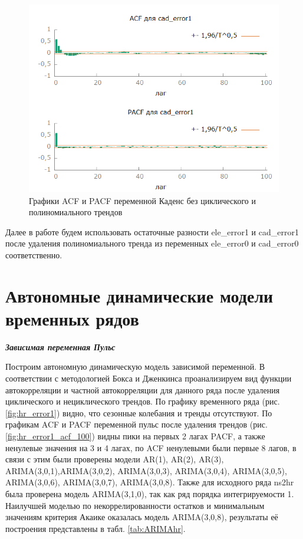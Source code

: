 \documentclass[a4paper,12pt]{article}
\begin{document}
\begin{figure}[H]
	\centering
	\includegraphics[width=0.5\linewidth]{../[graphics]/cad_error1_acf_100.png}
	\caption{Графики ACF и PACF переменной Каденс без циклического и полиномиального трендов}
	\label{fig:cad_error1_acf_100}
\end{figure}

Далее в работе будем использовать остаточные разности ele\_error1 и cad\_error1 после удаления полиномиального тренда из переменных ele\_error0 и cad\_error0 соответственно.

\section{Автономные динамические модели временных рядов}

\textbf{\textit{Зависимая переменная Пульс}}
		
Построим автономную динамическую модель зависимой переменной. В соответствии с методологией Бокса и Дженкинса проанализируем вид функции автокорреляции и частной автокорреляции для данного ряда после удаления циклического и нециклического трендов. По графику временного ряда (рис. \ref{fig:hr_error1}) видно, что сезонные колебания и тренды отсутствуют. По графикам ACF и PACF переменной пульс после удаления трендов (рис. \ref{fig:hr_error1_acf_100}) видны пики на первых 2 лагах PACF, а также ненулевые значения на 3 и 4 лагах, по ACF ненулевыми были первые 8 лагов, в связи с этим были проверены модели AR(1), AR(2), AR(3), ARIMA(3,0,1),ARIMA(3,0,2), ARIMA(3,0,3), ARIMA(3,0,4), ARIMA(3,0,5), ARIMA(3,0,6), ARIMA(3,0,7), ARIMA(3,0,8). Также для исходного ряда ns2hr была проверена модель ARIMA(3,1,0), так как ряд порядка интегрируемости 1. Наилучшей моделью по некоррелированности остатков и минимальным значениям критерия Акаике оказалась модель ARIMA(3,0,8), результаты её построения представлены в табл. \ref{tab:ARIMAhr}.
\end{document}
